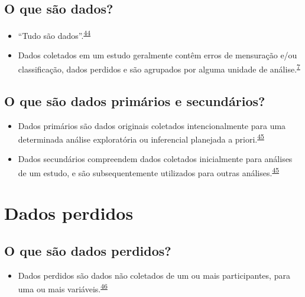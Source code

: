 \documentclass[
  a4paper,
]{book}
\providecommand{\tightlist}{%
  \setlength{\itemsep}{0pt}\setlength{\parskip}{0pt}}
\begin{document}
\hypertarget{o-que-suxe3o-dados}{%
\subsection{O que são dados?}\label{o-que-suxe3o-dados}}

\begin{itemize}
\item
  ``Tudo são dados''.\textsuperscript{\protect\hyperlink{ref-Olson2021}{44}}
\item
  Dados coletados em um estudo geralmente contêm erros de mensuração e/ou classificação, dados perdidos e são agrupados por alguma unidade de análise.\textsuperscript{\protect\hyperlink{ref-van2022}{7}}
\end{itemize}

\hypertarget{o-que-suxe3o-dados-primuxe1rios-e-secunduxe1rios}{%
\subsection{O que são dados primários e secundários?}\label{o-que-suxe3o-dados-primuxe1rios-e-secunduxe1rios}}

\begin{itemize}
\item
  Dados primários são dados originais coletados intencionalmente para uma determinada análise exploratória ou inferencial planejada a priori.\textsuperscript{\protect\hyperlink{ref-vetter2017}{45}}
\item
  Dados secundários compreendem dados coletados inicialmente para análises de um estudo, e são subsequentemente utilizados para outras análises.\textsuperscript{\protect\hyperlink{ref-vetter2017}{45}}
\end{itemize}

\hypertarget{dados-perdidos}{%
\section{Dados perdidos}\label{dados-perdidos}}

\hypertarget{o-que-suxe3o-dados-perdidos}{%
\subsection{O que são dados perdidos?}\label{o-que-suxe3o-dados-perdidos}}

\begin{itemize}
\tightlist
\item
  Dados perdidos são dados não coletados de um ou mais participantes, para uma ou mais variáveis.\textsuperscript{\protect\hyperlink{ref-Altman2007}{46}}
\end{itemize}
\end{document}
